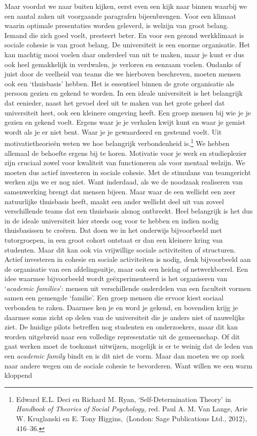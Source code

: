 \documentclass[smallauthor, chapterhaspagenum, nochapterinheader, pagenuminheader,  bigchapnum,medium2, tocpages,  garamond, titleinheader]{jote-book}
\begin{document}
	Maar voordat we naar buiten kijken, eerst even een kijk naar binnen waarbij we een aantal zaken uit voorgaande paragrafen bijeenbrengen. Voor een klimaat waarin optimale presentaties worden geleverd, is welzijn van groot belang. Iemand die zich goed voelt, presteert beter. En voor een gezond werkklimaat is sociale cohesie is van groot belang. De universiteit is een enorme organisatie. Het kan machtig mooi voelen daar onderdeel van uit te maken, maar je kunt er dus ook heel gemakkelijk in verdwalen, je verloren en eenzaam voelen. Ondanks of juist door de veelheid van teams die we hierboven beschreven, moeten mensen ook een ‘thuisbasis' hebben. Het is essentieel binnen de grote organisatie als persoon gezien en gekend te worden. In een ideale universiteit is het belangrijk dat eenieder, naast het gevoel deel uit te maken van het grote geheel dat universiteit heet, ook een kleinere omgeving heeft. Een groep mensen bij wie je je gezien en gekend voelt. Ergens waar je je verhalen kwijt kunt en waar je gemist wordt als je er niet bent. Waar je je gewaardeerd en gesteund voelt. Uit motivatietheorieën weten we hoe belangrijk verbondenheid is.\footnote{Edward E.L. Deci en Richard M. Ryan, ‘Self-Determination Theory' in \emph{Handbook}\emph{ of }\emph{Theories}\emph{ of }\emph{Social}\emph{ }\emph{Psychology}\emph{,} red. Paul A. M. Van Lange, Arie W. Kruglanski en E. Tony Higgins, (London: Sage Publications Ltd., 2012), 416--36. } We hebben allemaal de behoefte ergens bij te horen. Motivatie voor je werk en studieplezier zijn cruciaal zowel voor kwaliteit van functioneren als voor mentaal welzijn. We moeten dus actief investeren in sociale cohesie. Met de stimulans van teamgericht werken zijn we er nog niet. Want inderdaad, als we de noodzaak realiseren van samenwerking brengt dat mensen bijeen. Maar waar de een wellicht een zeer natuurlijke thuisbasis heeft, maakt een ander wellicht deel uit van zoveel verschillende teams dat een thuisbasis alsnog ontbreekt. Heel belangrijk is het dus in de ideale universiteit hier steeds oog voor te hebben en indien nodig thuisbasissen te creëren. Dat doen we in het onderwijs bijvoorbeeld met tutorgroepen, in een groot cohort ontstaat er dan een kleinere kring van studenten. Maar dit kan ook via vrijwillige sociale activiteiten of structuren. Actief investeren in cohesie en sociale activiteiten is nodig, denk bijvoorbeeld aan de organisatie van een afdelingsuitje, maar ook een heidag of netwerkborrel. Een idee waarmee bijvoorbeeld wordt geëxperimenteerd is het organiseren van ‘\emph{academic}\emph{ families}': mensen uit verschillende onderdelen van een faculteit vormen samen een gemengde ‘familie'. Een groep mensen die ervoor kiest sociaal verbonden te raken. Daarmee ken je en word je gekend, en bovendien krijg je daarmee soms zicht op delen van de universiteit die je anders niet of nauwelijks ziet. De huidige pilots betreffen nog studenten en onderzoekers, maar dit kan worden uitgebreid naar een volledige representatie uit de gemeenschap. Of dit gaat werken moet de toekomst uitwijzen, mogelijk is er te weinig dat de leden van een \emph{academic}\emph{ family} bindt en is dit niet de vorm. Maar dan moeten we op zoek naar andere wegen om de sociale cohesie te bevorderen. Want willen we een warm kloppend 
\end{document}
